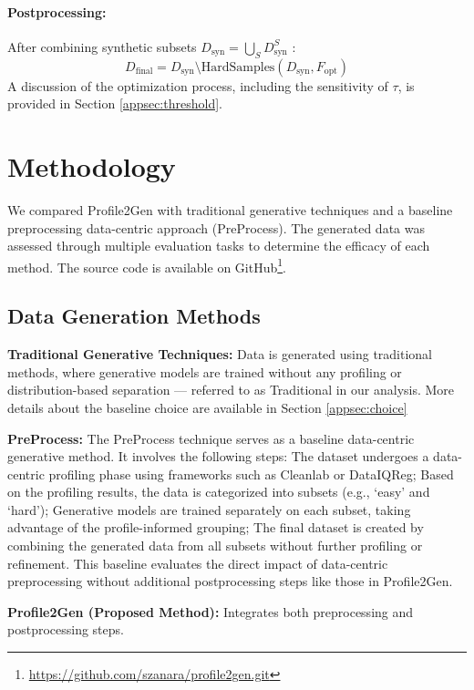 \documentclass{article}
\theoremstyle{plain}
\theoremstyle{definition}
\theoremstyle{remark}
\begin{document}
\paragraph{Postprocessing:} After combining synthetic subsets \( D_\text{syn} = \bigcup_S D_\text{syn}^S  \) :
\begin{equation}
D_\text{final} = D_\text{syn} \setminus \text{HardSamples}(D_\text{syn}, F_\text{opt})
\end{equation}
A discussion of the optimization process, including the sensitivity of $\tau$, is provided in Section \ref{appsec:threshold}.

\section{Methodology} \label{sec:methodology}
We compared Profile2Gen with traditional generative techniques and a baseline preprocessing data-centric approach (PreProcess). The generated data was assessed through multiple evaluation tasks to determine the efficacy of each method. The source code is available on GitHub\footnote{\href{https://github.com/szanara/profile2gen.git}{https://github.com/szanara/profile2gen.git}}.

\subsection{Data Generation Methods}

\textbf{Traditional Generative Techniques:}
Data is generated using traditional methods, where generative models are trained without any profiling or distribution-based separation — referred to as Traditional in our analysis. More details about the baseline choice are available in Section \ref{appsec:choice}

\textbf{PreProcess:}
The PreProcess technique serves as a baseline data-centric generative method. It involves the following steps: The dataset undergoes a data-centric profiling phase using frameworks such as Cleanlab or DataIQReg; 
Based on the profiling results, the data is categorized into subsets (e.g., `easy' and `hard');
Generative models are trained separately on each subset, taking advantage of the profile-informed grouping;
The final dataset is created by combining the generated data from all subsets without further profiling or refinement.
This baseline evaluates the direct impact of data-centric preprocessing without additional postprocessing steps like those in Profile2Gen.

\textbf{Profile2Gen (Proposed Method):} Integrates both preprocessing and postprocessing steps. 
\end{document}
